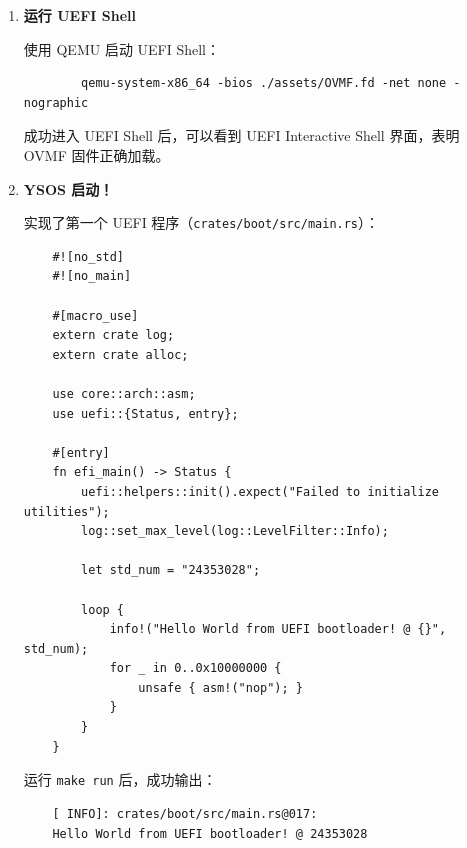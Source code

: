 \documentclass{SYSUReport}
\begin{document}
\begin{enumerate}[label={\chinese*、},labelsep=0pt]
\begin{verbatim}
    #[derive(Debug, PartialEq)]
    struct UniqueId(u16);

    impl UniqueId {
        fn new() -> Self {
            static COUNTER: AtomicU16 = AtomicU16::new(0);
            let id = COUNTER.fetch_add(1, Ordering::SeqCst);
            UniqueId(id)
        }
    }

    #[test]
    fn test_unique_id() {
        let id1 = UniqueId::new();
        let id2 = UniqueId::new();
        assert_ne!(id1, id2);
    }
        \end{verbatim}

        \item \textbf{运行 UEFI Shell}
        
        使用 QEMU 启动 UEFI Shell：
        \begin{verbatim}
        qemu-system-x86_64 -bios ./assets/OVMF.fd -net none -nographic
        \end{verbatim}
    
    成功进入 UEFI Shell 后，可以看到 UEFI Interactive Shell 界面，表明 OVMF 固件正确加载。

    \item \textbf{YSOS 启动！}
    
    实现了第一个 UEFI 程序（\texttt{crates/boot/src/main.rs}）：
    \begin{verbatim}
    #![no_std]
    #![no_main]

    #[macro_use]
    extern crate log;
    extern crate alloc;

    use core::arch::asm;
    use uefi::{Status, entry};

    #[entry]
    fn efi_main() -> Status {
        uefi::helpers::init().expect("Failed to initialize utilities");
        log::set_max_level(log::LevelFilter::Info);
        
        let std_num = "24353028";
        
        loop {
            info!("Hello World from UEFI bootloader! @ {}", std_num);
            for _ in 0..0x10000000 {
                unsafe { asm!("nop"); }
            }
        }
    }
    \end{verbatim}
    
    运行 \texttt{make run} 后，成功输出：
    \begin{verbatim}
    [ INFO]: crates/boot/src/main.rs@017: 
    Hello World from UEFI bootloader! @ 24353028
    \end{verbatim}

\end{enumerate}
\end{document}
